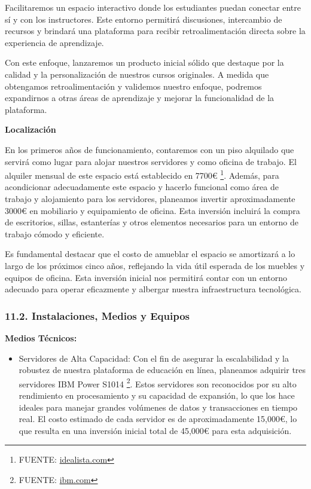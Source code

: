 \documentclass[
]{article}
\providecommand{\tightlist}{%
  \setlength{\itemsep}{0pt}\setlength{\parskip}{0pt}}
\begin{document}
Facilitaremos un espacio interactivo donde los estudiantes puedan
conectar entre sí y con los instructores. Este entorno permitirá
discusiones, intercambio de recursos y brindará una plataforma para
recibir retroalimentación directa sobre la experiencia de aprendizaje.

Con este enfoque, lanzaremos un producto inicial sólido que destaque por
la calidad y la personalización de nuestros cursos originales. A medida
que obtengamos retroalimentación y validemos nuestro enfoque, podremos
expandirnos a otras áreas de aprendizaje y mejorar la funcionalidad de
la plataforma.

\textbf{Localización}

En los primeros años de funcionamiento, contaremos con un piso alquilado
que servirá como lugar para alojar nuestros servidores y como oficina de
trabajo. El alquiler mensual de este espacio está establecido en 7700€
\footnote{FUENTE:
  \href{https://www.idealista.com/inmueble/104686841/}{idealista.com}}.
Además, para acondicionar adecuadamente este espacio y hacerlo funcional
como área de trabajo y alojamiento para los servidores, planeamos
invertir aproximadamente 3000€ en mobiliario y equipamiento de oficina.
Esta inversión incluirá la compra de escritorios, sillas, estanterías y
otros elementos necesarios para un entorno de trabajo cómodo y
eficiente.

Es fundamental destacar que el costo de amueblar el espacio se
amortizará a lo largo de los próximos cinco años, reflejando la vida
útil esperada de los muebles y equipos de oficina. Esta inversión
inicial nos permitirá contar con un entorno adecuado para operar
eficazmente y albergar nuestra infraestructura tecnológica.

\subsubsection{11.2. Instalaciones, Medios y
Equipos}\label{instalaciones-medios-y-equipos}

\textbf{Medios Técnicos:}

\begin{itemize}
\tightlist
\item
  Servidores de Alta Capacidad: Con el fin de asegurar la escalabilidad
  y la robustez de nuestra plataforma de educación en línea, planeamos
  adquirir tres servidores IBM Power S1014 \footnote{FUENTE:
    \href{https://www.ibm.com/es-es/products/power-s1014}{ibm.com}}.
  Estos servidores son reconocidos por su alto rendimiento en
  procesamiento y su capacidad de expansión, lo que los hace ideales
  para manejar grandes volúmenes de datos y transacciones en tiempo
  real. El costo estimado de cada servidor es de aproximadamente
  15,000€, lo que resulta en una inversión inicial total de 45,000€ para
  esta adquisición.
\end{itemize}
\end{document}
